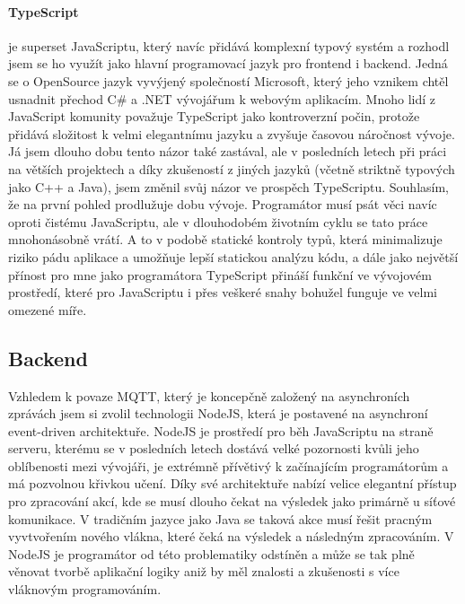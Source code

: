 \paragraph{TypeScript} je superset JavaScriptu, který navíc přidává komplexní typový systém a rozhodl jsem se ho využít jako hlavní programovací jazyk pro frontend i backend. Jedná se o OpenSource jazyk vyvýjený společností Microsoft, který jeho vznikem chtěl usnadnit přechod C\# a .NET vývojářum k webovým aplikacím. Mnoho lidí z JavaScript komunity považuje TypeScript jako kontroverzní počin, protože přidává složitost k velmi elegantnímu jazyku a zvyšuje časovou náročnost vývoje. Já jsem dlouho dobu tento názor také zastával, ale v posledních letech při práci na větších projektech a díky zkušeností z jiných jazyků (včetně striktně typových jako C++ a Java), jsem změnil svůj názor ve prospěch TypeScriptu. Souhlasím, že na první pohled prodlužuje dobu vývoje. Programátor musí psát věci navíc oproti čistému JavaScriptu, ale v dlouhodobém životním cyklu se tato práce  mnohonásobně vrátí. A to v podobě statické kontroly typů, která minimalizuje riziko pádu aplikace a umožňuje  lepší statickou analýzu kódu, a dále jako největší přínost pro mne jako programátora TypeScript přináší funkční  ve vývojovém prostředí, které pro JavaScriptu i přes veškeré snahy bohužel funguje ve velmi omezené míře.

\subsection{Backend}    %
Vzhledem k povaze MQTT, který je koncepčně založený na asynchroních zprávách jsem si zvolil technologii NodeJS, která je postavené na asynchroní event-driven architektuře. NodeJS je prostředí pro běh JavaScriptu na straně serveru, kterému se v posledních letech dostává velké pozornosti kvůli jeho oblíbenosti mezi vývojáři, je extrémně přívětivý k začínajícím programátorům a má pozvolnou křivkou učení. Díky své architektuře nabízí velice elegantní přístup pro zpracování akcí, kde se musí dlouho čekat na výsledek jako primárně u síťové komunikace. V tradičním jazyce jako Java se taková akce musí řešit pracným vyvtvořením nového vlákna, které čeká na výsledek a následným zpracováním. V NodeJS je programátor od této problematiky odstíněn a může se tak plně věnovat tvorbě aplikační logiky aniž by měl znalosti a zkušenosti s více vláknovým programováním.

